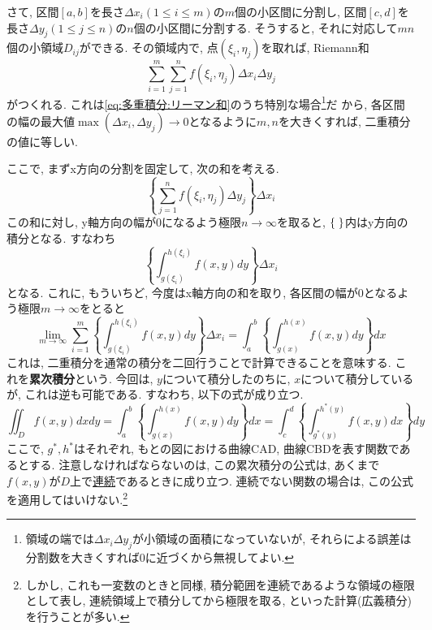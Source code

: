        さて, 区間$[a,b]$を長さ$\Delta x_i(1\leq i\leq m)$の$m$個の小区間に分割し, 区間$[c,d]$を長さ$\Delta y_j(1\leq j\leq n)$の$n$個の小区間に分割する. 
        そうすると, それに対応して$mn$個の小領域$D_{ij}$ができる. その領域内で, 点$(\xi_i,\eta_j)$を取れば, Riemann和
        \begin{equation}
            \sum_{i=1}^{m}\sum_{j=1}^{n}f(\xi_i,\eta_j)\Delta x_i\Delta y_j
        \end{equation}
        がつくれる. これは\eqref{eq:多重積分:リーマン和}のうち特別な場合\footnote{領域の端では$\Delta x_i\Delta y_j$が小領域の面積になっていないが, それらによる誤差は分割数を大きくすれば0に近づくから無視してよい.}だ
        から, 各区間の幅の最大値$\max(\Delta x_i,\Delta y_j)\to0$となるように$m,n$を大きくすれば, 二重積分の値に等しい.
        
        ここで, まずx方向の分割を固定して, 次の和を考える.
        \begin{equation}
            \left\{\sum_{j=1}^{n}f(\xi_i,\eta_j)\Delta y_j\right\}\Delta x_i
        \end{equation}
        この和に対し, y軸方向の幅が0になるよう極限$n\to\infty$を取ると, $\{\hspace{1mm}\}$内はy方向の積分となる. すなわち
        \begin{equation}
            \left\{\int_{g(\xi_i)}^{h(\xi_i)}f(x,y)dy\right\}\Delta x_i
        \end{equation}
        となる. これに, もういちど, 今度はx軸方向の和を取り, 各区間の幅が0となるよう極限$m\to\infty$をとると
        \begin{equation}
            \lim_{m\to\infty}\sum_{i=1}^{m}\left\{\int_{g(\xi_i)}^{h(\xi_i)}f(x,y)dy\right\}\Delta x_i=\int_{a}^{b}\left\{\int_{g(x)}^{h(x)}f(x,y)dy\right\}dx
        \end{equation}
        これは, 二重積分を通常の積分を二回行うことで計算できることを意味する. これを\textbf{累次積分}という.
        今回は, $y$について積分したのちに, $x$について積分しているが, これは逆も可能である. すなわち, 以下の式が成り立つ.
        \begin{equation}
            \iint_D f(x,y)dxdy = \int_{a}^{b}\left\{\int_{g(x)}^{h(x)}f(x,y)dy\right\}dx = \int_{c}^{d}\left\{\int_{g^*(y)}^{h^*(y)}f(x,y)dx\right\}dy \label{eq:多重積分:累次積分}
        \end{equation}
        ここで, $g^*,h^*$はそれぞれ, もとの図における曲線CAD, 曲線CBDを表す関数であるとする. 注意しなければならないのは, この累次積分の公式は, あくまで$f(x,y)$が$D$上で\underline{連続}であるときに成り立つ.
        連続でない関数の場合は, この公式を適用してはいけない.\footnote{しかし, これも一変数のときと同様, 積分範囲を連続であるような領域の極限として表し, 連続領域上で積分してから極限を取る, といった計算(広義積分)を行うことが多い. }\\

